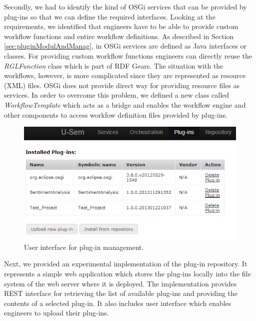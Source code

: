 Secondly, we had to identify the kind of OSGi services that can be provided by plug-ins so that we can define the required interfaces. Looking at the requirements, we identified that engineers have to be able to provide custom workflow functions and entire workflow definitions. As described in Section \ref{sec:pluginModulAndManag}, in OSGi services are defined as Java interfaces or classes. For providing custom workflow functions engineers can directly reuse the \textit{RGLFunction} class which is part of RDF Gears. The situation with the workflows, however, is more complicated since they are represented as resource (XML) files. OSGi does not provide direct way for providing resource files as services. In order to overcome this problem, we defined a new class called \textit{WorkflowTemplate} which acts as a bridge and enables the workflow engine and other components to access workfow definition files provided by plug-ins.

\begin{figure}[h!]
  \centering
  	\includegraphics[scale=0.70]{plug-in/ui/list.png}
  \caption{User interface for plug-in management.}
  \label{list_ui}
\end{figure}

Next, we provided an experimental implementation of the plug-in repository. It represents a simple web application which stores the plug-ins locally into the file system of the web server where it is deployed. The implementation provides REST interface for retrieving the list of available plug-ins and providing the contents of a selected plug-in. It also includes user interface which enables engineers to upload their plug-ins. 


